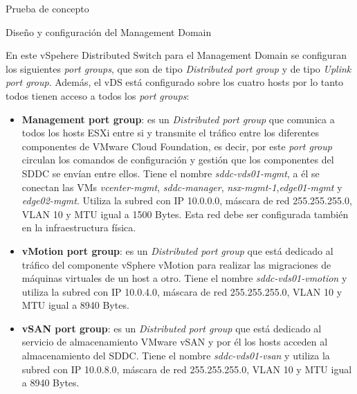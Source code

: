 \begin{section}{Prueba de concepto}
\begin{subsection}{Diseño y configuración del Management Domain}
\begin{itemize}
    \end{itemize}
    En este vSpehere Distributed Switch para el Management Domain se configuran los siguientes \textit{port groups}, que son de tipo \textit{Distributed port group} y de tipo \textit{Uplink port group}. Además, el vDS está configurado sobre los cuatro hosts por lo tanto todos tienen acceso a todos los \textit{port groups}:
    \begin{itemize}
           
            \item \textbf{Management port group}: es un \textit{Distributed port group} que comunica a todos los hosts ESXi entre si y transmite el tráfico entre los diferentes componentes de VMware Cloud Foundation, es decir, por este \textit{port group} circulan los comandos de configuración y gestión que los componentes del SDDC se envían entre ellos. Tiene el nombre \textit{sddc-vds01-mgmt}, a él se conectan las VMs \textit{vcenter-mgmt}, \textit{sddc-manager}, \textit{nsx-mgmt-1},\textit{edge01-mgmt} y \textit{edge02-mgmt}. Utiliza la subred con IP 10.0.0.0, máscara de red 255.255.255.0, VLAN 10 y MTU igual a 1500 Bytes. Esta red debe ser configurada también en la infraestructura física.
            
            \item \textbf{vMotion port group}: es un \textit{Distributed port group} que está dedicado al tráfico del componente vSphere vMotion para realizar las migraciones de máquinas virtuales de un host a otro. Tiene el nombre \textit{sddc-vds01-vmotion} y utiliza la subred con IP 10.0.4.0, máscara de red 255.255.255.0, VLAN 10 y MTU igual a 8940 Bytes.
            
            \item \textbf{vSAN port group}: es un \textit{Distributed port group} que está dedicado al servicio de almacenamiento VMware vSAN y por él los hosts acceden al almacenamiento del SDDC. Tiene el nombre \textit{sddc-vds01-vsan} y utiliza la subred con IP 10.0.8.0, máscara de red 255.255.255.0, VLAN 10 y MTU igual a 8940 Bytes.
            

\end{itemize}
\end{subsection}
\end{section}
